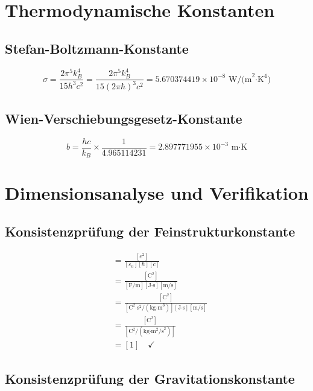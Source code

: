 \documentclass[12pt,a4paper]{article}
\theoremstyle{definition}
\begin{document}
	\section{Thermodynamische Konstanten}
	
	\subsection{Stefan-Boltzmann-Konstante}
	
	\begin{equation}
		\sigma = \frac{2\pi^5 k_B^4}{15 h^3 c^2} = \frac{2\pi^5 k_B^4}{15 (2\pi\hbar)^3 c^2} = 5.670374419 \times 10^{-8} \text{ W/(m}^2\text{·K}^4\text{)}
	\end{equation}
	
	\subsection{Wien-Verschiebungsgesetz-Konstante}
	
	\begin{equation}
		b = \frac{hc}{k_B} \times \frac{1}{4.965114231} = 2.897771955 \times 10^{-3} \text{ m·K}
	\end{equation}
	
	\section{Dimensionsanalyse und Verifikation}
	
	\subsection{Konsistenzpr\"ufung der Feinstrukturkonstante}
	
	\begin{align}
		[\alpha] &= \frac{[e^2]}{[\varepsilon_0][\hbar][c]}\\
		&= \frac{[\text{C}^2]}{[\text{F/m}][\text{J·s}][\text{m/s}]}\\
		&= \frac{[\text{C}^2]}{[\text{C}^2\text{·s}^2/(\text{kg·m}^3)][\text{J·s}][\text{m/s}]}\\
		&= \frac{[\text{C}^2]}{[\text{C}^2/(\text{kg·m}^2\text{/s}^2)]}\\
		&= [1] \quad \checkmark
	\end{align}
	
	\subsection{Konsistenzpr\"ufung der Gravitationskonstante}
	
\end{document}
